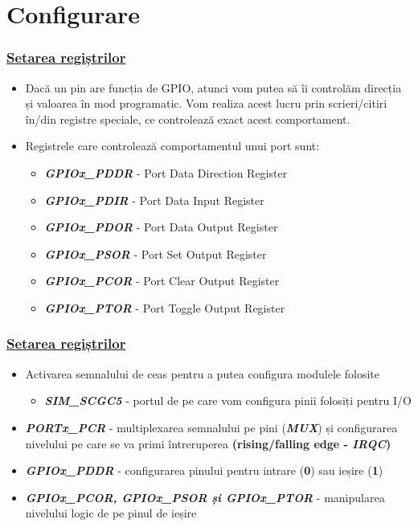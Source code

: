 \documentclass[xcolor={table}]{beamer}
\begin{document}
	\section{Configurare}
	\begin{frame}
	    \frametitle{\href{https://github.com/undacmic/MCULabs/blob/main/Resurse/FRDM-KL25Z_ReferenceManual.pdf}{Setarea regiștrilor}}
	    \begin{itemize}
	        \item Dacă un pin are funcția de GPIO, atunci vom putea să îi controlăm direcția și valoarea în mod programatic. Vom realiza acest lucru prin scrieri/citiri în/din registre speciale, ce controlează exact acest comportament.
	        \item Registrele care controlează comportamentul unui port sunt:
	        \begin{itemize}
	            \item \textbf{\textit{GPIOx\_PDDR}} - Port Data Direction Register
	            \item \textbf{\textit{GPIOx\_PDIR}} - Port Data Input Register
	            \item \textbf{\textit{GPIOx\_PDOR}} - Port Data Output Register
	            \item \textbf{\textit{GPIOx\_PSOR}} - Port Set Output Register
	            \item \textbf{\textit{GPIOx\_PCOR}} - Port Clear Output Register
	            \item \textbf{\textit{GPIOx\_PTOR}} - Port Toggle Output Register
	        \end{itemize}
	    \end{itemize}
	\end{frame}
		\begin{frame}
	    \frametitle{\href{https://github.com/undacmic/MCULabs/blob/main/Resurse/FRDM-KL25Z_ReferenceManual.pdf}{Setarea regiștrilor}}
	    \begin{itemize}
	        \item Activarea semnalului de ceas pentru a putea configura modulele folosite
	        \begin{itemize}
	            \item \textbf{\textit{SIM\_SCGC5}} - portul de pe care vom configura pinii folosiți pentru I/O
	        \end{itemize}
	        \item \textbf{\textit{PORTx\_PCR}} - multiplexarea semnalului pe pini (\textbf{\textit{MUX}}) și configurarea nivelului pe care se va primi întreruperea \textbf{(rising/falling edge - \textit{IRQC})}
	        \item \textbf{\textit{GPIOx\_PDDR}} - configurarea pinului pentru intrare (\textbf{0}) sau ieșire (\textbf{1})
	        \item \textbf{\textit{GPIOx\_PCOR, GPIOx\_PSOR și GPIOx\_PTOR}} - manipularea nivelului logic de pe pinul de ieșire
	    \end{itemize}
	\end{frame}
\end{document}
